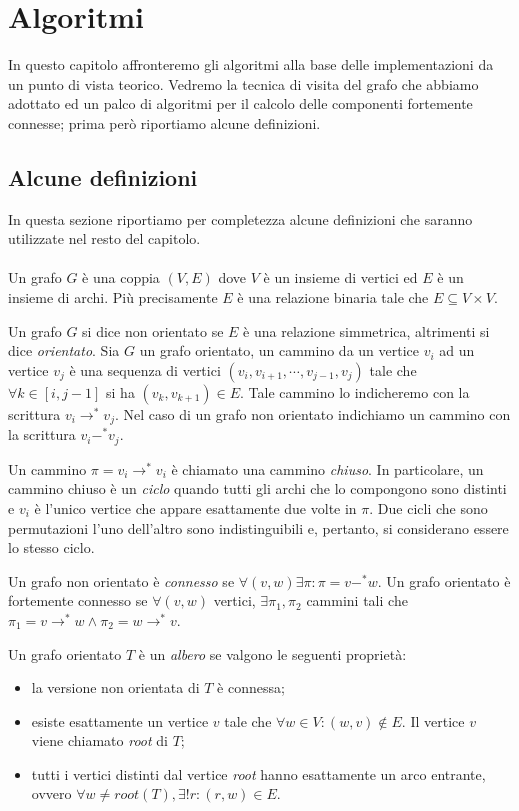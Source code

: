 \chapter{Algoritmi}
\label{chapter:theoretical-background}
In questo capitolo affronteremo gli algoritmi alla base delle
implementazioni da un punto di vista teorico. Vedremo la tecnica di
visita del grafo che abbiamo adottato ed un palco di algoritmi per il
calcolo delle componenti fortemente connesse; prima per\`o riportiamo
alcune definizioni.

\section{Alcune definizioni}
\label{subsection:some-definitions}
In questa sezione riportiamo per completezza alcune definizioni che
saranno utilizzate nel resto del capitolo.
\\\\
Un grafo $G$ \`e una coppia $(V, E)$ dove $V$ \`e un insieme di
vertici ed $E$ \`e un insieme di archi. Pi\`u precisamente $E$ \`e una
relazione binaria tale che $E \subseteq V \times V$.

Un grafo $G$ si dice non orientato se $E$ \`e una relazione
simmetrica, altrimenti si dice \emph{orientato}. Sia $G$ un grafo
orientato, un cammino da un vertice $v_{i}$ ad un vertice $v_{j}$ \`e
una sequenza di vertici $(v_{i}, v_{i+1}, \cdots, v_{j-1}, v_{j})$
tale che $\forall k \in [i, j-1]$ si ha $(v_{k},v_{k+1}) \in E$. Tale
cammino lo indicheremo con la scrittura $v_{i} \rightarrow^{*}
v_{j}$. Nel caso di un grafo non orientato indichiamo un cammino con
la scrittura $v_{i} -^{*} v_{j}$.

Un cammino $\pi = v_{i} \rightarrow^{*} v_{i}$ \`e chiamato una
cammino \emph{chiuso}. In particolare, un cammino chiuso \`e un
\emph{ciclo} quando tutti gli archi che lo compongono sono distinti e
$v_{i}$ \`e l'unico vertice che appare esattamente due volte in
$\pi$. Due cicli che sono permutazioni l'uno dell'altro sono
indistinguibili e, pertanto, si considerano essere lo stesso ciclo.

Un grafo non orientato \`e \emph{connesso} se $\forall (v, w) \exists
\pi: \pi = v -^{*} w$. Un grafo orientato \`e fortemente connesso se
$\forall (v, w)$ vertici, $\exists \pi_{1}, \pi_{2}$ cammini tali che
$\pi_{1} = v \rightarrow^{*} w \wedge \pi_{2} = w \rightarrow^{*} v$.

Un grafo orientato $T$ \`e un \emph{albero} se valgono le seguenti
propriet\`a:
\begin{itemize}
\item la versione non orientata di $T$ \`e connessa;
\item esiste esattamente un vertice $v$ tale che $\forall w \in V: (w,
  v) \not \in E$. Il vertice $v$ viene chiamato \emph{root} di $T$;
\item tutti i vertici distinti dal vertice \emph{root} hanno
  esattamente un arco entrante, ovvero $\forall w \not = root(T),
  \exists!r: (r, w) \in E$.
\end{itemize}

